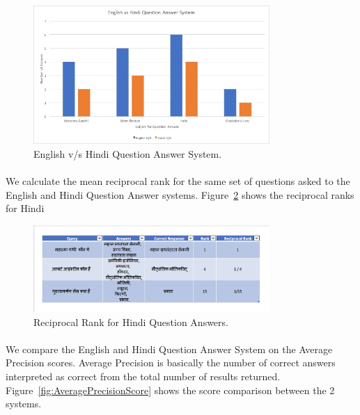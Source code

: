 \begin{figure}[htb]
\centering
\includegraphics[width=0.8\textwidth]{images/QA_performance3.jpg}
\caption{English v/s Hindi Question Answer System.} 
\label{fig:QA_performance3}
\end{figure}

\break
\paragraph{}
We calculate the mean reciprocal rank for the same set of questions asked to the English and Hindi Question Answer systems. Figure~\ref{fig:score_table} shows the reciprocal ranks for Hindi

\begin{figure}[htb]
\centering
\includegraphics[width=0.8\textwidth]{images/score_table.jpg}
\caption{Reciprocal Rank for Hindi Question Answers.} 
\label{fig:score_table}
\end{figure}

\paragraph{}
We compare the English and Hindi Question Answer System on the  Average Precision scores. Average  Precision is basically the number of correct answers interpreted as correct from the total number of results returned. Figure~\ref{fig:AveragePrecisionScore} shows the score comparison between the 2 systems.


